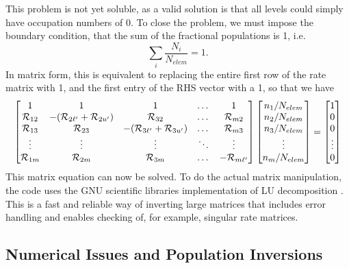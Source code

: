 %
This problem is not yet soluble, as a valid solution is that all levels 
could simply have occupation numbers of $0$. To close the problem, we must impose the boundary condition, that the sum of the fractional populations is 1, i.e.
%
\begin{equation}
\sum_i \frac{N_i}{N_{elem}} = 1.
\end{equation}
In matrix form, this is equivalent to replacing the entire first row
of the rate matrix with 1, and the first entry of the RHS vector with a 1,
so that we have
%
\begin{equation}
\begin{bmatrix}
    1  & 1 & 1 & \dots & 1\\
    {\cal R}_{12} & -({\cal R}_{2{\ell^\prime}} + {\cal R}_{2{u^\prime}}) & {\cal R}_{32} & \dots & {\cal R}_{m2} \\
    {\cal R}_{13}  & {\cal R}_{23} & -({\cal R}_{3{\ell^\prime}} + {\cal R}_{3{u^\prime}}) & \dots & {\cal R}_{m3} \\
    \vdots & \vdots & \vdots & \ddots & \vdots \\
    {\cal R}_{1m}      & {\cal R}_{2m} & {\cal R}_{3m} & \dots & -{\cal R}_{m{\ell^\prime}}
\end{bmatrix}
\begin{bmatrix}
    n_1 / N_{elem} \\
    n_2 / N_{elem} \\
    n_3 / N_{elem} \\
    \vdots         \\
    n_m / N_{elem} 
\end{bmatrix}
=
\begin{bmatrix}
    1 \\
    0 \\
    0 \\
    \vdots \\
    0
\end{bmatrix}
\end{equation}
%
This matrix equation can now be solved.
To do the actual matrix manipulation, the code uses the GNU 
scientific libraries \citep[GSL;][]{GSL} implementation of
LU decomposition \citep{turing}. This is a fast and reliable way of
inverting large matrices that includes error handling and enables
checking of, for example, singular rate matrices.

\subsection{Numerical Issues and Population Inversions}
\label{sec:numerical_matom}












